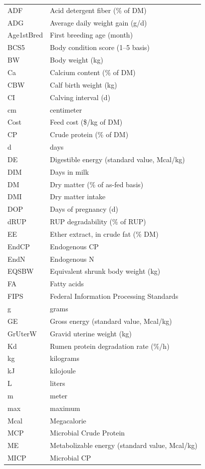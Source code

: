 \documentclass{article}
\begin{document}
\begin{longtable}{@{} L{0.23\textwidth} L{0.70\textwidth} @{}}
ADF & Acid detergent fiber (\% of DM) \\
ADG & Average daily weight gain (g/d) \\
Age1stBred & First breeding age (month) \\
BCS5 & Body condition score (1–5 basis) \\
BW & Body weight (kg) \\
Ca & Calcium content (\% of DM) \\
CBW & Calf birth weight (kg) \\
CI & Calving interval (d) \\
cm & centimeter \\
Cost & Feed cost (\$/kg of DM) \\
CP & Crude protein (\% of DM) \\
d & days \\
DE & Digestible energy (standard value, Mcal/kg) \\
DIM & Days in milk \\
DM & Dry matter (\% of as-fed basis) \\
DMI & Dry matter intake \\
DOP & Days of pregnancy (d) \\
dRUP & RUP degradability (\% of RUP) \\
EE & Ether extract, in crude fat (\% DM) \\
EndCP & Endogenous CP \\
EndN & Endogenous N \\
EQSBW & Equivalent shrunk body weight (kg) \\
FA & Fatty acids \\
FIPS & Federal Information Processing Standards \\
g & grams \\
GE & Gross energy (standard value, Mcal/kg) \\
GrUterW & Gravid uterine weight (kg) \\
Kd & Rumen protein degradation rate (\%/h) \\
kg & kilograms \\
kJ & kilojoule \\
L & liters \\
m & meter \\
max & maximum \\
Mcal & Megacalorie \\
MCP & Microbial Crude Protein \\
ME & Metabolizable energy (standard value, Mcal/kg) \\
MICP & Microbial CP \\

\end{longtable}
\end{document}
